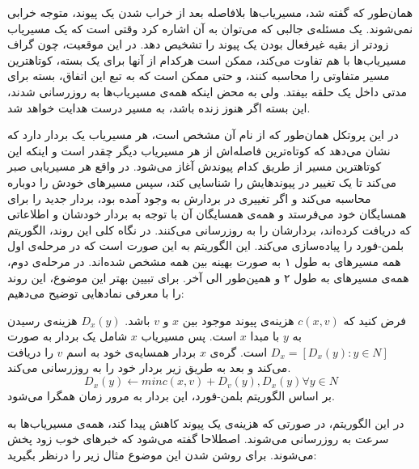 همان‌طور که گفته شد، مسیریاب‌ها بلافاصله بعد از خراب شدن یک پیوند، متوجه خرابی نمی‌شوند.  یک مسئله‌ی جالبی که می‌توان به آن اشاره کرد وقتی است که یک مسیریاب زودتر از بقیه غیرفعال بودن یک پیوند را تشخیص دهد. در این موقعیت، چون گراف مسیریاب‌ها با هم تفاوت می‌‌کند، ممکن است هرکدام از آنها برای یک بسته، کوتاهترین مسیر متفاوتی را محاسبه کنند، و حتی ممکن است که به تبع این اتفاق، بسته برای مدتی داخل یک حلقه بیفتد. ولی به محض اینکه همه‌ی مسیریاب‌ها به روزرسانی شدند، این بسته اگر هنوز زنده باشد، به مسیر درست هدایت خواهد شد. 
 
در این پروتکل همان‌طور که از نام آن مشخص است، هر مسیریاب یک بردار دارد که نشان می‌دهد که کوتاه‌ترین فاصله‌‌اش از هر مسیریاب دیگر چقدر است و اینکه این کوتاهترین مسیر از طریق کدام پیوندش آغاز می‌شود. در واقع هر مسیریابی صبر می‌کند تا یک تغییر در پیوند‌هایش را شناسایی کند، سپس مسیرهای خودش را دوباره محاسبه می‌‌کند و اگر تغییری در بردارش به وجود آمده بود، بردار جدید را برای همسایگان خود می‌فرستد و همه‌ی همسایگان آن با توجه به بردار خودشان و اطلاعاتی که دریافت کرده‌اند، بردارشان را به روزرسانی می‌‌کنند. در نگاه کلی این روند، الگوریتم بلمن-فورد را پیاده‌سازی می‌‌کند. این الگوریتم به این صورت است که در مرحله‌ی اول همه مسیرهای به طول ۱ به صورت بهینه بین همه مشخص شده‌اند. در مرحله‌ی دوم، همه‌ی مسیرهای به طول ۲ و همین‌طور الی آخر. 
برای تبیین بهتر این موضوع، این روند را با معرفی نمادهایی توضیح می‌دهیم:‌

فرض کنید که $c(x,v)$ هزینه‌ی پیوند موجود بین $x$ و $v$ باشد. $D_{x}(y)$ هزینه‌ی رسیدن به $y$ با مبدا $x$ است. پس مسیریاب $x$ شامل یک بردار به صورت $D_{x}=[D_{x}(y):y\in N]$ است. گره‌ی $x$ بردار همسایه‌ی خود به اسم $v$  را دریافت می‌‌کند و بعد به طریق زیر بردار خود را به 
روزرسانی می‌کند. $$D_{x}(y) \leftarrow min{c(x,v) + D_{v}(y), D_{x}(y)} \forall y \in N$$
بر اساس الگوریتم بلمن-فورد، این بردار به مرور زمان همگرا می‌شود. 
   
  در این الگوریتم، در صورتی که هزینه‌ی یک پیوند کاهش پیدا کند، همه‌ی مسیریاب‌ها به سرعت به روزرسانی می‌شوند. اصطلاحا گفته می‌شود که خبرهای خوب زود پخش می‌شوند. برای روشن شدن این موضوع مثال زیر را درنظر بگیرید:
  

